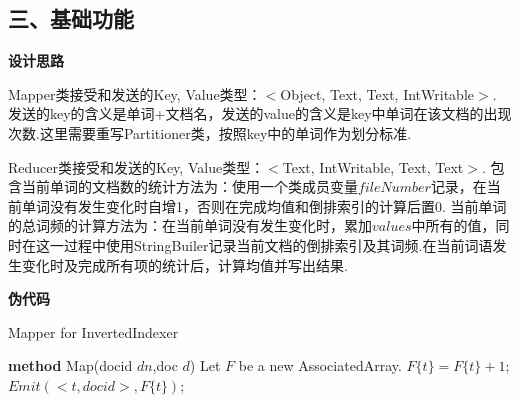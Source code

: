 \documentclass[a4paper,UTF8]{article}
\theoremstyle{definition}
\begin{document}
\begin{CJK}{UTF8}{gkai}
\begin{CJK*}{UTF8}{gbsn}
\section*{三、基础功能}
\end{CJK*}
	\par \textbf{设计思路}
	\par Mapper类接受和发送的Key, Value类型：$<$Object, Text, Text, IntWritable$>$. 发送的key的含义是单词+文档名，发送的value的含义是key中单词在该文档的出现次数.这里需要重写Partitioner类，按照key中的单词作为划分标准.
	\par Reducer类接受和发送的Key, Value类型：$<$Text, IntWritable, Text, Text$>$. 包含当前单词的文档数的统计方法为：使用一个类成员变量$fileNumber$记录，在当前单词没有发生变化时自增1，否则在完成均值和倒排索引的计算后置0. 当前单词的总词频的计算方法为：在当前单词没有发生变化时，累加$values$中所有的值，同时在这一过程中使用StringBuiler记录当前文档的倒排索引及其词频.在当前词语发生变化时及完成所有项的统计后，计算均值并写出结果.
	\par \textbf{伪代码}

\begin{algorithm}[htb]
\caption{Mapper for InvertedIndexer}
\label{alg:Framwork}
\begin{algorithmic}[1] %
	 \STATE \textbf{method} Map(docid $dn$,doc $d$)
    \STATE Let $F$ be a new AssociatedArray.
	 	\STATE $F\{t\} = F\{t\} + 1$;
	 \ENDFOR
	 	\STATE $Emit(<t, docid>, F\{t\})$;
	 \ENDFOR
	 \RETURN
\end{algorithmic}
\end{algorithm}


\end{CJK}
\end{document}
